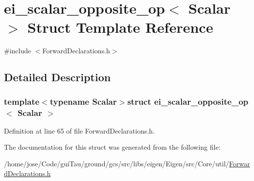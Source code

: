 \hypertarget{structei__scalar__opposite__op}{\section{ei\-\_\-scalar\-\_\-opposite\-\_\-op$<$ Scalar $>$ Struct Template Reference}
\label{structei__scalar__opposite__op}
}


{\ttfamily \#include $<$Forward\-Declarations.\-h$>$}



\subsection{Detailed Description}
\subsubsection*{template$<$typename Scalar$>$struct ei\-\_\-scalar\-\_\-opposite\-\_\-op$<$ Scalar $>$}



Definition at line 65 of file Forward\-Declarations.\-h.



The documentation for this struct was generated from the following file\-:\begin{DoxyCompactItemize}
\item 
/home/jose/\-Code/gui\-Tau/ground/gcs/src/libs/eigen/\-Eigen/src/\-Core/util/\hyperlink{_forward_declarations_8h}{Forward\-Declarations.\-h}\end{DoxyCompactItemize}
